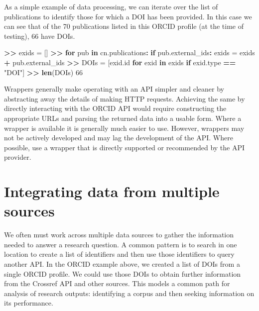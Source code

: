 \documentclass[]{krantz}
\newenvironment{Shaded}{\begin{snugshade}}{\end{snugshade}}
\newcommand{\KeywordTok}[1]{\textcolor[rgb]{0.13,0.29,0.53}{\textbf{#1}}}
\newcommand{\DecValTok}[1]{\textcolor[rgb]{0.00,0.00,0.81}{#1}}
\newcommand{\StringTok}[1]{\textcolor[rgb]{0.31,0.60,0.02}{#1}}
\newcommand{\ControlFlowTok}[1]{\textcolor[rgb]{0.13,0.29,0.53}{\textbf{#1}}}
\newcommand{\OperatorTok}[1]{\textcolor[rgb]{0.81,0.36,0.00}{\textbf{#1}}}
\newcommand{\ErrorTok}[1]{\textcolor[rgb]{0.64,0.00,0.00}{\textbf{#1}}}
\newcommand{\NormalTok}[1]{#1}
\begin{document}
As a simple example of data processing, we can iterate over the list of
publications to identify those for which a DOI has been provided. In
this case we can see that of the 70 publications listed in this ORCID
profile (at the time of testing), 66 have DOIs.

\begin{Shaded}
\begin{Highlighting}[]
\OperatorTok{>}\ErrorTok{>}\StringTok{ }\NormalTok{exids =}\StringTok{ }\NormalTok{[]}
\OperatorTok{>}\ErrorTok{>}\StringTok{ }\ControlFlowTok{for}\NormalTok{ pub }\ControlFlowTok{in}\NormalTok{ cn.publications}\OperatorTok{:}
\StringTok{        }\ControlFlowTok{if}\NormalTok{ pub.external_ids}\OperatorTok{:}
\StringTok{        }\NormalTok{exids =}\StringTok{ }\NormalTok{exids }\OperatorTok{+}\StringTok{ }\NormalTok{pub.external_ids}
\OperatorTok{>}\ErrorTok{>}\StringTok{ }\NormalTok{DOIs =}\StringTok{ }\NormalTok{[exid.id }\ControlFlowTok{for}\NormalTok{ exid }\ControlFlowTok{in}\NormalTok{ exids }\ControlFlowTok{if}\NormalTok{ exid.type }\OperatorTok{==}\StringTok{ "DOI"}\NormalTok{]}
\OperatorTok{>}\ErrorTok{>}\StringTok{ }\KeywordTok{len}\NormalTok{(DOIs)}
\DecValTok{66}
\end{Highlighting}
\end{Shaded}

Wrappers generally make operating with an API simpler and cleaner by
abstracting away the details of making HTTP requests. Achieving the same
by directly interacting with the ORCID API would require constructing
the appropriate URLs and parsing the returned data into a usable form.
Where a wrapper is available it is generally much easier to use.
However, wrappers may not be actively developed and may lag the
development of the API. Where possible, use a wrapper that is directly
supported or recommended by the API provider.

\section{Integrating data from multiple
sources}\label{integrating-data-from-multiple-sources}

We often must work across multiple data sources to gather the
information needed to answer a research question. A common pattern is to
search in one location to create a list of identifiers and then use
those identifiers to query another API. In the ORCID example above, we
created a list of DOIs from a single ORCID profile. We could use those
DOIs to obtain further information from the Crossref API and other
sources. This models a common path for analysis of research outputs:
identifying a corpus and then seeking information on its performance.
\end{document}
